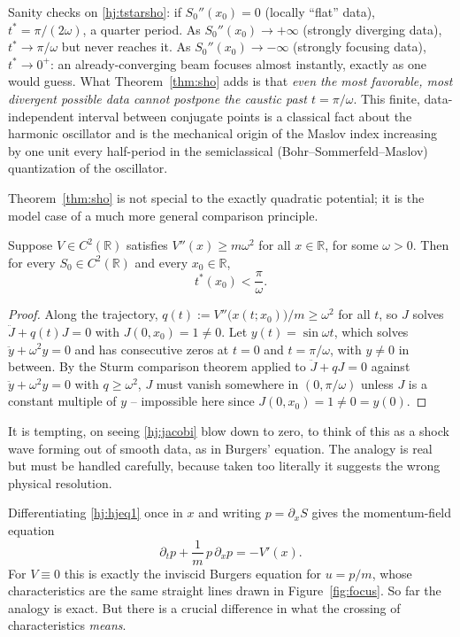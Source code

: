 Sanity checks on \eqref{hj:tstarsho}: if $S_0''(x_0)=0$ (locally ``flat''
data), $t^\ast=\pi/(2\omega)$, a quarter period. As $S_0''(x_0)\to+\infty$
(strongly diverging data), $t^\ast\to\pi/\omega$ but never reaches it. As
$S_0''(x_0)\to-\infty$ (strongly focusing data), $t^\ast\to0^+$: an
already-converging beam focuses almost instantly, exactly as one would guess.
What Theorem~\ref{thm:sho} adds is that \emph{even the most favorable, most
divergent possible data cannot postpone the caustic past $t=\pi/\omega$}. This
finite, data-independent interval between conjugate points is a classical fact
about the harmonic oscillator and is the
mechanical origin of the Maslov index increasing by one unit every half-period
in the semiclassical (Bohr--Sommerfeld--Maslov) quantization of the oscillator.

Theorem~\ref{thm:sho} is not special to the exactly quadratic potential; it is
the model case of a much more general comparison principle.

\begin{theorem}
\label{thm:sturm}
Suppose $V\in C^2(\mathbb{R})$ satisfies $V''(x)\ge m\omega^2$ for all
    $x\in\mathbb{R}$, for some $\omega>0$. Then for every $S_0\in
    C^2(\mathbb{R})$ and every $x_0\in\mathbb{R}$,
\[
t^\ast(x_0) < \frac{\pi}{\omega}.
\]
\end{theorem}

\begin{proof}
Along the trajectory, $q(t):=V''\big(x(t;x_0)\big)/m \ge \omega^2$ for all $t$,
    so $J$ solves $\ddot J + q(t)J=0$ with $J(0,x_0)=1\ne0$. Let
    $y(t)=\sin\omega t$, which solves $\ddot y+\omega^2y=0$ and has consecutive
    zeros at $t=0$ and $t=\pi/\omega$, with $y\ne0$ in between. By the Sturm
    comparison theorem applied to $\ddot J+qJ=0$ against $\ddot
    y+\omega^2y=0$ with $q\ge\omega^2$, $J$ must vanish somewhere in
    $(0,\pi/\omega)$ unless $J$ is a constant multiple of $y$ -- impossible
    here since $J(0,x_0)=1\ne 0=y(0)$.
\end{proof}

It is tempting, on seeing \eqref{hj:jacobi} blow down to zero, to think of this
as a shock wave forming out of smooth data, as in Burgers' equation. The
analogy is real but must be handled carefully, because taken too literally it
suggests the wrong physical resolution.

Differentiating \eqref{hj:hjeq1} once in $x$ and writing $p=\partial_xS$ gives
the momentum-field equation
\begin{equation}
\partial_tp + \frac{1}{m}\,p\,\partial_xp = -V'(x).
\label{hj:burgers}
\end{equation}
For $V\equiv0$ this is exactly the inviscid Burgers equation for $u=p/m$, whose
characteristics are the same straight lines drawn in Figure~\ref{fig:focus}. So
far the analogy is exact. But there is a crucial difference in what the
crossing of characteristics \emph{means}.

